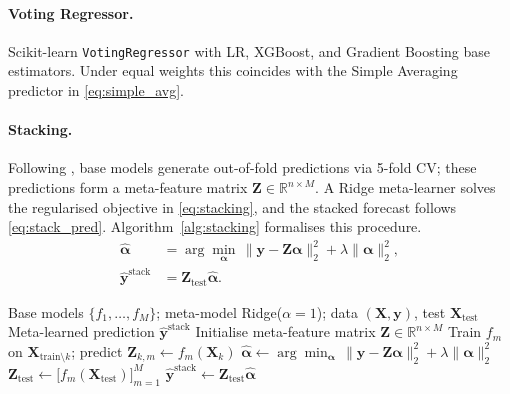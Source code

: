 \paragraph{Voting Regressor.} Scikit-learn \texttt{VotingRegressor} with LR, XGBoost, and Gradient Boosting base estimators. Under equal weights this coincides with the Simple Averaging predictor in \eqref{eq:simple_avg}.

\paragraph{Stacking.} Following \parencite{wolpert1992stacking}, base models generate out-of-fold predictions via 5-fold CV; these predictions form a meta-feature matrix $\mathbf{Z}\in\mathbb{R}^{n\times M}$. A Ridge meta-learner solves the regularised objective in \eqref{eq:stacking}, and the stacked forecast follows \eqref{eq:stack_pred}. Algorithm~\ref{alg:stacking} formalises this procedure.
\begin{align}
 \boldsymbol{\hat{\alpha}} &= \arg\min_{\boldsymbol{\alpha}}\,
 \|\mathbf{y}-\mathbf{Z}\boldsymbol{\alpha}\|_2^2 + \lambda\|\boldsymbol{\alpha}\|_2^2,
 \label{eq:stacking} \\
 \hat{\mathbf{y}}^{\text{stack}} &= \mathbf{Z}_{\text{test}}\boldsymbol{\hat{\alpha}}.
 \label{eq:stack_pred}
\end{align}

\begin{algorithm}[H]
\caption{Stacking Ensemble (Meta-Learning via 5-Fold CV)}
\label{alg:stacking}
\begin{algorithmic}[1]
\Require Base models $\{f_1,\ldots,f_M\}$; meta-model Ridge($\alpha{=}1$); data $(\mathbf{X},\mathbf{y})$, test $\mathbf{X}_{\text{test}}$
\Ensure Meta-learned prediction $\hat{\mathbf{y}}^{\text{stack}}$
\State Initialise meta-feature matrix $\mathbf{Z}\in\mathbb{R}^{n\times M}$
 \State Train $f_m$ on $\mathbf{X}_{\text{train}\setminus k}$; predict $\mathbf{Z}_{k,m}\gets f_m(\mathbf{X}_k)$
 \EndFor
\EndFor
\State $\boldsymbol{\hat{\alpha}} \gets \arg\min_{\boldsymbol{\alpha}}\,\|\mathbf{y}-\mathbf{Z}\boldsymbol{\alpha}\|_2^2 + \lambda\|\boldsymbol{\alpha}\|_2^2$
\State $\mathbf{Z}_{\text{test}} \gets \bigl[f_m(\mathbf{X}_{\text{test}})\bigr]_{m=1}^{M}$
\State \Return $\hat{\mathbf{y}}^{\text{stack}} \gets \mathbf{Z}_{\text{test}}\boldsymbol{\hat{\alpha}}$
\end{algorithmic}
\end{algorithm}

